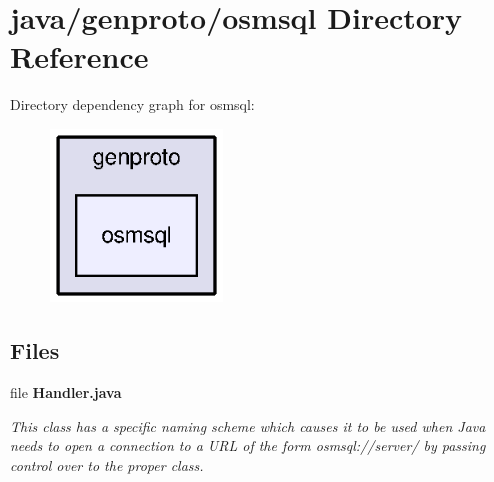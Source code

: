 \section{java/genproto/osmsql Directory Reference}
\label{dir_d7e3ce18747015d129b8f64d6faa4b30}
Directory dependency graph for osmsql\+:\nopagebreak
\begin{figure}[H]
\begin{center}
\leavevmode
\includegraphics[width=130pt]{dir_d7e3ce18747015d129b8f64d6faa4b30_dep}
\end{center}
\end{figure}
\subsection*{Files}
\begin{DoxyCompactItemize}
\item 
file {\bf Handler.\+java}
\begin{DoxyCompactList}\small\item\em This class has a specific naming scheme which causes it to be used when Java needs to open a connection to a U\+R\+L of the form osmsql\+://server/ by passing control over to the proper class. \end{DoxyCompactList}\end{DoxyCompactItemize}
